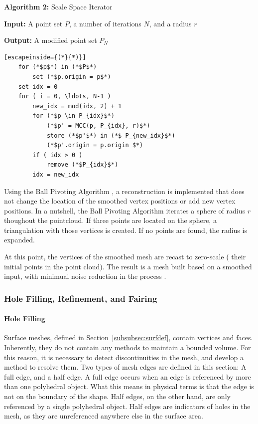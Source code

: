 \documentclass[12pt]{drexelthesis}
\let\Oldsubsubsection\subsubsection
\renewcommand{\subsubsection}{\FloatBarrier\Oldsubsubsection}
\begin{document}
\textbf{Algorithm 2:} Scale Space Iterator

  \textbf{Input:} A point set $P$, a number of iterations $N$, and a radius $r$
	
  \textbf{Output:} A modified point set $P_{N}$


\begin{lstlisting}[escapeinside={(*}{*)}]
	for (*$p$*) in (*$P$*)
		set (*$p.origin = p$*)
	set idx = 0
	for ( i = 0, \ldots, N-1 )
		new_idx = mod(idx, 2) + 1
		for (*$p \in P_{idx}$*)
			(*$p' = MCC(p, P_{idx}, r)$*)
			store (*$p'$*) in (*$ P_{new_idx}$*)
			(*$p'.origin = p.origin $*)
		if ( idx > 0 )
			remove (*$P_{idx}$*)
		idx = new_idx
\end{lstlisting}

Using the Ball Pivoting Algorithm \cite{ballpivot}, a reconstruction is implemented that does not change the location of the smoothed vertex positions or add new vertex positions. In a nutshell, the Ball Pivoting Algorithm iterates a sphere of radius $r$ thoughout the pointcloud. If three points are located on the sphere, a triangulation with those vertices is created. If no points are found, the radius is expanded.

At this point, the vertices of the smoothed mesh are recast to zero-scale ( their initial points in the point cloud). The result is a mesh built based on a smoothed input, with minimual noise reduction in the process \cite{RN67}.

\subsubsection{Hole Filling, Refinement, and Fairing}
\paragraph{Hole Filling}
Surface meshes, defined in Section~\ref{subsubsec:surfdef}, contain vertices and faces. Inherently, they do not contain any methods to maintain a bounded volume. For this reason, it is necessary to detect discontinuities in the mesh, and develop a method to resolve them. Two types of mesh edges are defined in this section: A full edge, and a half edge.
A full edge occurs when an edge is referenced by more than one polyhedral object. What this means in physical terms is that the edge is not on the boundary of the shape. Half edges, on the other hand, are only referenced by a single polyhedral object. Half edges are indicators of holes in the mesh, as they are unreferenced anywhere else in the surface area.
\end{document}
